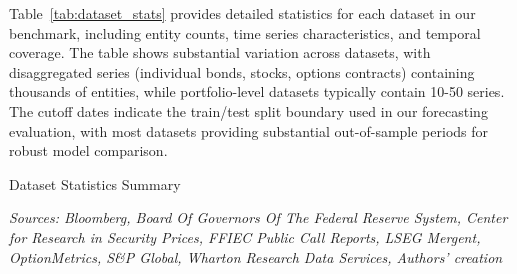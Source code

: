 \documentclass{article}
\begin{document}
Table~\ref{tab:dataset_stats} provides detailed statistics for each dataset in our benchmark, including entity counts, time series characteristics, and temporal coverage. The table shows substantial variation across datasets, with disaggregated series (individual bonds, stocks, options contracts) containing thousands of entities, while portfolio-level datasets typically contain 10-50 series. The cutoff dates indicate the train/test split boundary used in our forecasting evaluation, with most datasets providing substantial out-of-sample periods for robust model comparison.

\begin{table}[htbp]
\centering
\caption{Dataset Statistics Summary}
\label{tab:dataset_stats}

\vspace{0.1cm}
\scriptsize
\caption*{\emph{Sources: Bloomberg, Board Of Governors Of The Federal Reserve System, Center for Research in Security Prices, FFIEC Public Call Reports, LSEG Mergent, OptionMetrics, S\&P Global, Wharton Research Data Services, Authors' creation}}
\end{table}


\end{document}
